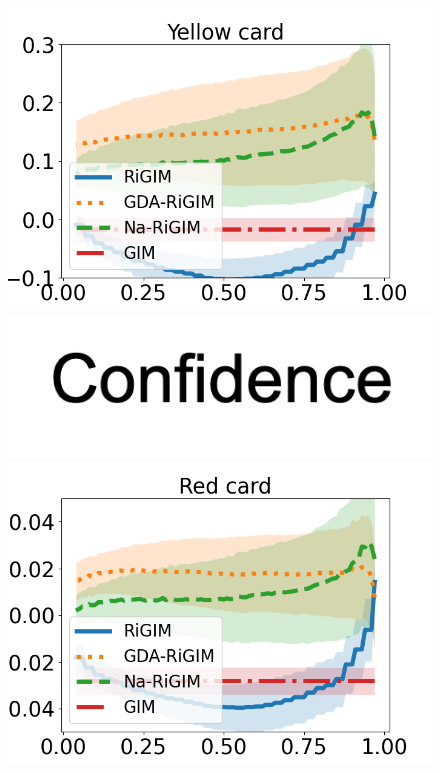 \documentclass[letterpaper]{article} %
\begin{document}
\begin{figure}[htbp]
\begin{minipage}{0.16\textwidth}
    \includegraphics[scale=0.16]{figures/soccer_risk_curve_Yel_shadow.png}\par
    \vspace{-0.05in}
    \includegraphics[scale=0.12]{figures/confidence_x_label.png}
    \end{minipage}
    \begin{minipage}{0.16\textwidth}
    \centering
    \includegraphics[scale=0.16]{figures/soccer_risk_curve_Red_shadow.png}\par

\end{minipage}
\end{figure}
\end{document}
